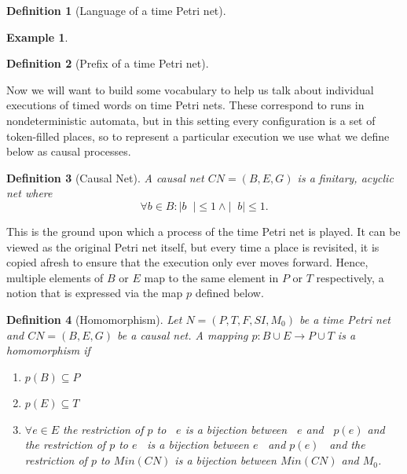 \documentclass{article}
\DeclareMathOperator*{\pre}{^\bullet}
\theoremstyle{Definition}
\newtheorem{definition}{Definition}
\theoremstyle{definition}
\newtheorem{example}{Example}
\begin{document}
	\begin{definition}[Language of a time Petri net]
	\end{definition}

	\begin{example}\label{TPN}
		\end{example}
	
	
	\begin{definition}[Prefix of a time Petri net]
	\end{definition}

	Now we will want to build some vocabulary to help us talk about individual executions of timed words on time Petri nets. 
	These correspond to runs in nondeterministic automata, but in this setting every configuration is a set of token-filled places, so to represent a particular execution we use what we define below as causal processes. 
	
	\begin{definition}[Causal Net] \label{cn}
		A \textit{causal net} $CN = (B, E, G)$ is a finitary, acyclic net where 
		$$\forall b \in B : |b \pre| \leq 1 \wedge | \pre b| \leq 1.$$
	\end{definition}
	
	This is the ground upon which a process of the time Petri net is played. 
	It can be viewed as the original Petri net itself, but every time a place is revisited, it is copied afresh to ensure that the execution only ever moves forward. 
	Hence, multiple elements of $B$ or $E$ map to the same element in $P$ or $T$ respectively, a notion that is expressed via the map $p$ defined below. 
	
	\begin{definition}[Homomorphism] \label{hom}  Let $N = (P, T, F, SI, M_0)$ be a time Petri net and $CN = (B, E, G)$ be a causal net. 
	A mapping $p : B \cup E \rightarrow P \cup T$ is a \textit{homomorphism} if 
		
		\begin{enumerate}
			\item $p(B) \subseteq P$
			\item $p(E) \subseteq T$
			\item $\forall e \in E$ the restriction of $p$ to $\pre e$ is a bijection between $\pre e$ and $\pre p(e)$ and the restriction of $p$ to $e \pre $ is a bijection between $e \pre $ and $p(e) \pre $ and the restriction of $p$ to $Min(CN)$ is a bijection between $Min(CN)$ and $M_0$. 
		\end{enumerate}
	\end{definition}
	
\end{document}
